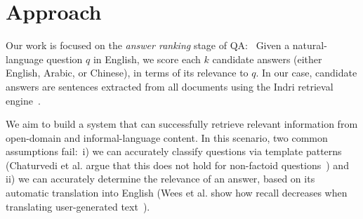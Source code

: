 \documentclass{sig-alternate-05-2015}
\newcommand{\ignore}[1]{}
\begin{document}



\section{Approach}\label{sec:main}


Our work is focused on the \emph{answer ranking} stage of QA:\
Given a natural-language question $q$ in English, we score each $k$ candidate answers (either English, Arabic, or Chinese), 
in terms of its relevance to $q$. In our case, candidate answers are sentences extracted from all documents 
using the Indri retrieval engine~\cite{Metzler:2005}. 

\ignore{Our approach is not limited to any question type, factoid or non-factoid. Our main motivation is to provide good QA quality on
any multilingual Web collection. This entails finding answers to questions where there is no single answer, and for which human 
agreement is low.}

We aim to build a system that can successfully retrieve relevant information from open-domain and 
informal-language content. In this scenario, two common assumptions fail:\ i) we can accurately classify questions via template 
patterns (Chaturvedi et al. argue that this does not hold for non-factoid questions~\cite{Chaturvedi:2014aa})
and ii) we can accurately determine the relevance of an answer, based on its automatic translation into English (Wees et al. 
show how recall decreases when translating user-generated text~\cite{Wees:2015aa}).
\end{document}
